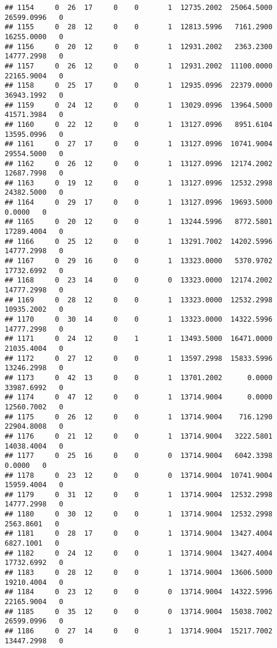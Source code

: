 \documentclass[
]{article}
\begin{document}
\begin{enumerate}
\begin{verbatim}
## 1154     0  26  17     0    0       1  12735.2002  25064.5000  26599.0996   0
## 1155     0  28  12     0    0       1  12813.5996   7161.2900  16255.0000   0
## 1156     0  20  12     0    0       1  12931.2002   2363.2300  14777.2998   0
## 1157     0  26  12     0    0       1  12931.2002  11100.0000  22165.9004   0
## 1158     0  25  17     0    0       1  12935.0996  22379.0000  36943.1992   0
## 1159     0  24  12     0    0       1  13029.0996  13964.5000  41571.3984   0
## 1160     0  22  12     0    0       1  13127.0996   8951.6104  13595.0996   0
## 1161     0  27  17     0    0       1  13127.0996  10741.9004  29554.5000   0
## 1162     0  26  12     0    0       1  13127.0996  12174.2002  12687.7998   0
## 1163     0  19  12     0    0       1  13127.0996  12532.2998  24382.5000   0
## 1164     0  29  17     0    0       1  13127.0996  19693.5000      0.0000   0
## 1165     0  20  12     0    0       1  13244.5996   8772.5801  17289.4004   0
## 1166     0  25  12     0    0       1  13291.7002  14202.5996  14777.2998   0
## 1167     0  29  16     0    0       1  13323.0000   5370.9702  17732.6992   0
## 1168     0  23  14     0    0       0  13323.0000  12174.2002  14777.2998   0
## 1169     0  28  12     0    0       1  13323.0000  12532.2998  10935.2002   0
## 1170     0  30  14     0    0       1  13323.0000  14322.5996  14777.2998   0
## 1171     0  24  12     0    1       1  13493.5000  16471.0000  21035.4004   0
## 1172     0  27  12     0    0       1  13597.2998  15833.5996  13246.2998   0
## 1173     0  42  13     0    0       1  13701.2002      0.0000  33987.6992   0
## 1174     0  47  12     0    0       1  13714.9004      0.0000  12560.7002   0
## 1175     0  26  12     0    0       1  13714.9004    716.1290  22904.8008   0
## 1176     0  21  12     0    0       1  13714.9004   3222.5801  14038.4004   0
## 1177     0  25  16     0    0       0  13714.9004   6042.3398      0.0000   0
## 1178     0  23  12     0    0       0  13714.9004  10741.9004  15959.4004   0
## 1179     0  31  12     0    0       1  13714.9004  12532.2998  14777.2998   0
## 1180     0  30  12     0    0       1  13714.9004  12532.2998   2563.8601   0
## 1181     0  28  17     0    0       1  13714.9004  13427.4004   6827.1001   0
## 1182     0  24  12     0    0       1  13714.9004  13427.4004  17732.6992   0
## 1183     0  28  12     0    0       1  13714.9004  13606.5000  19210.4004   0
## 1184     0  23  12     0    0       0  13714.9004  14322.5996  22165.9004   0
## 1185     0  35  12     0    0       0  13714.9004  15038.7002  26599.0996   0
## 1186     0  27  14     0    0       1  13714.9004  15217.7002  13447.2998   0

\end{verbatim}
\end{enumerate}
\end{document}
